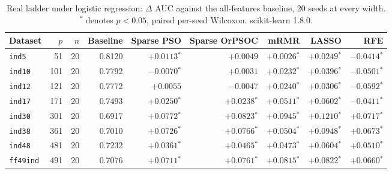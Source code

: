 \begin{table}[htbp]
    \centering
    \small\setlength{\tabcolsep}{4pt}
    \begin{tabular}{lrrrrrrrr}
    \hline
    Dataset & $p$ & $n$ & Baseline & Sparse PSO & Sparse OrPSOC & mRMR & LASSO & RFE \\
    \hline
    \texttt{ind5} & 51 & 20 & 0.8120 & $+0.0113$$^{*}$ & $+0.0049$ & $+0.0026$$^{*}$ & $+0.0249$$^{*}$ & $-0.0414$$^{*}$ \\
    \texttt{ind10} & 101 & 20 & 0.7792 & $-0.0070$$^{*}$ & $+0.0031$ & $+0.0232$$^{*}$ & $+0.0396$$^{*}$ & $-0.0501$$^{*}$ \\
    \texttt{ind12} & 121 & 20 & 0.7772 & $+0.0055$ & $-0.0047$ & $+0.0240$$^{*}$ & $+0.0306$$^{*}$ & $-0.0592$$^{*}$ \\
    \texttt{ind17} & 171 & 20 & 0.7493 & $+0.0250$$^{*}$ & $+0.0238$$^{*}$ & $+0.0511$$^{*}$ & $+0.0602$$^{*}$ & $-0.0411$$^{*}$ \\
    \texttt{ind30} & 301 & 20 & 0.6917 & $+0.0772$$^{*}$ & $+0.0823$$^{*}$ & $+0.0945$$^{*}$ & $+0.1210$$^{*}$ & $+0.0717$$^{*}$ \\
    \texttt{ind38} & 361 & 20 & 0.7010 & $+0.0726$$^{*}$ & $+0.0766$$^{*}$ & $+0.0504$$^{*}$ & $+0.0948$$^{*}$ & $+0.0673$$^{*}$ \\
    \texttt{ind48} & 481 & 20 & 0.7232 & $+0.0361$$^{*}$ & $+0.0465$$^{*}$ & $+0.0473$$^{*}$ & $+0.0604$$^{*}$ & $+0.0510$$^{*}$ \\
    \texttt{ff49ind} & 491 & 20 & 0.7076 & $+0.0711$$^{*}$ & $+0.0761$$^{*}$ & $+0.0815$$^{*}$ & $+0.0822$$^{*}$ & $+0.0660$$^{*}$ \\
    \hline
    \end{tabular}
    \caption{Real ladder under logistic regression: $\Delta$ AUC against the all-features baseline, 20 seeds at every width. $^{*}$ denotes $p < 0.05$, paired per-seed Wilcoxon. scikit-learn 1.8.0.}
    \label{tab:dimreal}
\end{table}

